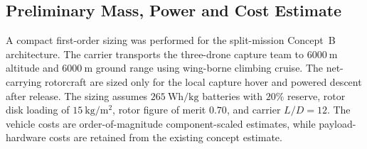 


\subsection{Preliminary Mass, Power and Cost Estimate}

A compact first-order sizing was performed for the split-mission Concept~B architecture. The carrier transports the three-drone capture team to $6000~\mathrm{m}$ altitude and $6000~\mathrm{m}$ ground range using wing-borne climbing cruise. The net-carrying rotorcraft are sized only for the local capture hover and powered descent after release. The sizing assumes $265~\mathrm{Wh/kg}$ batteries with $20\%$ reserve, rotor disk loading of $15~\mathrm{kg/m^2}$, rotor figure of merit $0.70$, and carrier $L/D=12$. The vehicle costs are order-of-magnitude component-scaled estimates, while payload-hardware costs are retained from the existing concept estimate.

